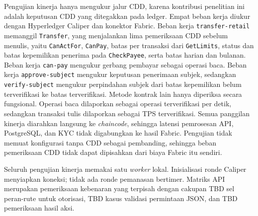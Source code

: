Pengujian kinerja hanya mengukur jalur CDD, karena kontribusi penelitian ini
adalah keputusan CDD yang ditegakkan pada ledger. Empat beban kerja diukur
dengan Hyperledger Caliper dan konektor Fabric. Beban kerja
\texttt{transfer-retail} memanggil \texttt{Transfer}, yang menjalankan lima
pemeriksaan CDD sebelum menulis, yaitu \texttt{CanActFor}, \texttt{CanPay},
batas per transaksi dari \texttt{GetLimits}, status dan batas kepemilikan
penerima pada \texttt{CheckPayee}, serta batas harian dan bulanan. Beban kerja
\texttt{can-pay} mengukur gerbang pembayar sebagai operasi baca. Beban kerja
\texttt{approve-subject} mengukur keputusan penerimaan subjek, sedangkan
\texttt{verify-subject} mengukur perpindahan subjek dari batas kepemilikan
belum terverifikasi ke batas terverifikasi. Metode kontrak lain hanya diperiksa
secara fungsional. Operasi baca dilaporkan sebagai operasi terverifikasi per
detik, sedangkan transaksi tulis dilaporkan sebagai TPS terverifikasi. Semua
panggilan kinerja diarahkan langsung ke \textit{chaincode}, sehingga latensi
pemrosesan API, PostgreSQL, dan KYC tidak digabungkan ke hasil Fabric.
Pengujian tidak memuat konfigurasi tanpa CDD sebagai pembanding, sehingga beban
pemeriksaan CDD tidak dapat dipisahkan dari biaya Fabric itu sendiri.

Seluruh pengujian kinerja memakai satu \textit{worker} lokal. Inisialisasi ronde
Caliper menyiapkan koneksi; tidak ada ronde pemanasan bertimer. Matriks API
merupakan pemeriksaan kebenaran yang terpisah dengan cakupan TBD sel peran-rute untuk
otorisasi, TBD kasus validasi permintaan JSON, dan TBD pemeriksaan hasil aksi.

